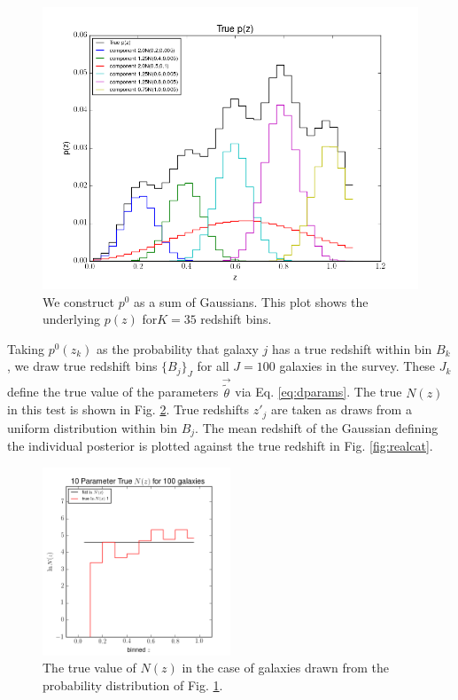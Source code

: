 \documentclass[preprint]{aastex}
\begin{document}
\begin{figure}
\includegraphics[width=\textwidth]{truePz.png}
\caption{We construct $p^{0}$ as a sum of Gaussians.  This plot shows the underlying $p(z)$ for$K=35$ redshift bins.}
\label{fig:truepz}
\end{figure}

Taking $p^{0}(z_{k})$ as the probability that galaxy $j$ has a true redshift within bin $B_{k}$, we draw true redshift bins $\{B_{j}\}_{J}$ for all $J=100$ galaxies in the survey.  These $J_{k}$ define the true value of the parameters $\vec{\tilde{\theta}}$ via Eq. \ref{eq:dparams}.  The true $N(z)$ in this test is shown in Fig. \ref{fig:realtrueNz}.  True redshifts $z'_{j}$ are taken as draws from a uniform distribution within bin $B_{j}$.  The mean redshift of the Gaussian defining the individual posterior is plotted against the true redshift in Fig. \ref{fig:realcat}.

\begin{figure}
\includegraphics[width=0.5\textwidth]{real/trueNz.png}
\caption{The true value of $N(z)$ in the case of galaxies drawn from the probability distribution of Fig. \ref{fig:truepz}.}
\label{fig:realtrueNz}
\end{figure}
\end{document}
